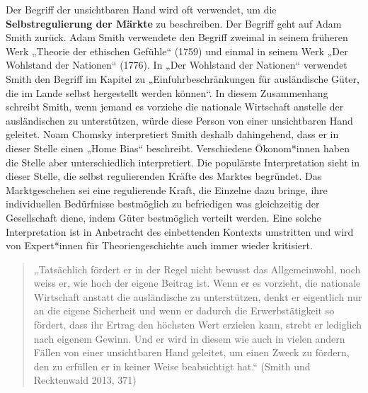 \documentclass[
  nswissgerman,
  a4paper,
  DIV=11,
  numbers=noendperiod,
  oneside,
  openany]{scrreprt}
\begin{document}
\begin{tcolorbox}[enhanced jigsaw, arc=.35mm, bottomrule=.15mm, bottomtitle=1mm, breakable, colback=white, colbacktitle=quarto-callout-tip-color!10!white, colframe=quarto-callout-tip-color-frame, coltitle=black, left=2mm, leftrule=.75mm, opacityback=0, opacitybacktitle=0.6, rightrule=.15mm, title={Exkurs: Die unsichtbare Hand des Marktes}, titlerule=0mm, toprule=.15mm, toptitle=1mm]

Der Begriff der unsichtbaren Hand wird oft verwendet, um die
\textbf{Selbstregulierung der Märkte} zu beschreiben. Der Begriff geht
auf Adam Smith zurück. Adam Smith verwendete den Begriff zweimal in
seinem früheren Werk „Theorie der ethischen Gefühle`` (1759) und einmal
in seinem Werk „Der Wohlstand der Nationen`` (1776). In „Der Wohlstand
der Nationen`` verwendet Smith den Begriff im Kapitel zu
„Einfuhrbeschränkungen für ausländische Güter, die im Lande selbst
hergestellt werden können``. In diesem Zusammenhang schreibt Smith, wenn
jemand es vorziehe die nationale Wirtschaft anstelle der ausländischen
zu unterstützen, würde diese Person von einer unsichtbaren Hand
geleitet. Noam Chomsky interpretiert Smith deshalb dahingehend, dass er
in dieser Stelle einen „Home Bias`` beschreibt. Verschiedene
Ökonom*innen haben die Stelle aber unterschiedlich interpretiert. Die
populärste Interpretation sieht in dieser Stelle, die selbst
regulierenden Kräfte des Marktes begründet. Das Marktgeschehen sei eine
regulierende Kraft, die Einzelne dazu bringe, ihre individuellen
Bedürfnisse bestmöglich zu befriedigen was gleichzeitig der Gesellschaft
diene, indem Güter bestmöglich verteilt werden. Eine solche
Interpretation ist in Anbetracht des einbettenden Kontexts umstritten
und wird von Expert*innen für Theoriengeschichte auch immer wieder
kritisiert.

\begin{quote}
„Tatsächlich fördert er in der Regel nicht bewusst das Allgemeinwohl,
noch weiss er, wie hoch der eigene Beitrag ist. Wenn er es vorzieht, die
nationale Wirtschaft anstatt die ausländische zu unterstützen, denkt er
eigentlich nur an die eigene Sicherheit und wenn er dadurch die
Erwerbstätigkeit so fördert, dass ihr Ertrag den höchsten Wert erzielen
kann, strebt er lediglich nach eigenem Gewinn. Und er wird in diesem wie
auch in vielen andern Fällen von einer unsichtbaren Hand geleitet, um
einen Zweck zu fördern, den zu erfüllen er in keiner Weise beabsichtigt
hat.`` (Smith und Recktenwald 2013, 371)
\end{quote}

\end{tcolorbox}
\end{document}
